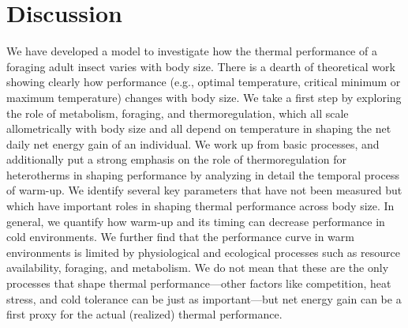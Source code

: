 
\section*{Discussion}

We have developed a model to investigate how the thermal performance of a foraging adult insect varies with body size.
There is a dearth of theoretical work showing clearly how performance (e.g., optimal temperature, critical minimum or maximum temperature) changes with body size.
We take a first step by exploring the role of metabolism, foraging, and thermoregulation, which all scale allometrically with body size and all depend on temperature in shaping the net daily net energy gain of an individual.
We work up from basic processes, and additionally put a strong emphasis on the role of thermoregulation for heterotherms in shaping performance by analyzing in detail the temporal process of warm-up.
We identify several key parameters that have not been measured but which have important roles in shaping thermal performance across body size.
In general, we quantify how warm-up and its timing can decrease performance in cold environments.
We further find that the performance curve in warm environments is limited by physiological and ecological processes such as resource availability, foraging, and metabolism.
We do not mean that these are the only processes that shape thermal performance---other factors like competition, heat stress, and cold tolerance can be just as important---but net energy gain can be a first proxy for the actual (realized) thermal performance.


